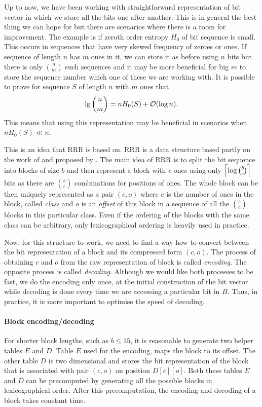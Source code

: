 Up to now, we have been working with straightforward representation of bit vector in which we store
all the bits one after another. This is in general the best thing we can hope for but there are scenarios
where there is a room for improvement. The example is if zeroth order entropy $H_0$ of bit sequence
is small. This occurs in sequences that have very skewed frequency of zeroes or ones. If sequence of
length $n$ has $m$ ones in it, we can store it as before using $n$ bits but there is only ${n \choose m}$
such sequences and it may be more beneficial for big $m$ to store the sequence number which one of these
we are working with. It is possible to prove for sequence $S$ of length $n$ with $m$ ones that
$$\mathop{\mathrm{lg}} {n \choose m} = nH_0(S)+\mathcal{O}(\log n).$$ This means that using this representation may be
beneficial in scenarios when $nH_0(S)\ll n$.

This is an idea that RRR is based on. RRR is a data structure based partly on the work of \cite{pagh2001low}
and proposed by \cite{raman2007succinct}. The main idea of RRR is to split the bit sequence into blocks of size
$b$ and then represent a block with $c$ ones using only $\left\lceil \log {b \choose c} \right\rceil$ bits as
there are ${b \choose c}$ combinations for positions of ones. The whole block can be then uniquely
represented as a pair $(c, o)$ where $c$ is the number of ones in the block, called \emph{class} and
$o$ is an \emph{offset} of this block in a sequence of all the ${b \choose c}$ blocks in this particular class.
Even if the ordering of the blocks with the same class can be arbitrary, only lexicographical ordering
is heavily used in practice.

Now, for this structure to work, we need to find a way how to convert between the bit representation of
a block and its compressed form $(c, o)$. The process of obtaining $c$ and $o$ from the raw representation
of block is called \textit{encoding}. The opposite process is called \textit{decoding}. Although
we would like both processes to be fast, we do the encoding only once, at the initial construction
of the bit vector while decoding is done every time we are accessing a particular bit in $B$. Thus,
in practice, it is more important to optimise the speed of decoding.

\paragraph{Block encoding/decoding}

For shorter block lengths, such as $b\leq 15$, it is reasonable to generate two helper tables $E$ and $D$.
Table $E$ used for the encoding, maps the block to its offset. The other table $D$ is two dimensional and
stores the bit representation of the block that is associated with pair $(c, o)$ on position $D[c][o]$.
Both these tables $E$ and $D$ can be precomputed by generating all the possible blocks in lexicographical
order. After this precomputation, the encoding and decoding of a block takes constant time.

